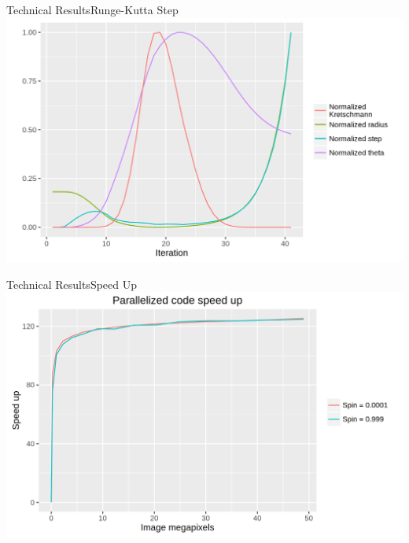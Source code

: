 \begin{frame}{Technical Results}{Runge-Kutta Step}
	\centering
	\includegraphics[width=0.7\paperwidth]{gfx/kretschmann}
\end{frame}

\begin{frame}{Technical Results}{Speed Up}
\centering
\includegraphics[width=0.7\paperwidth]{gfx/speedup}
\end{frame}









